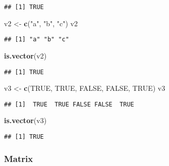 \documentclass[
]{article}
\newenvironment{Shaded}{\begin{snugshade}}{\end{snugshade}}
\newcommand{\ConstantTok}[1]{\textcolor[rgb]{0.56,0.35,0.01}{#1}}
\newcommand{\FunctionTok}[1]{\textcolor[rgb]{0.13,0.29,0.53}{\textbf{#1}}}
\newcommand{\NormalTok}[1]{#1}
\newcommand{\OtherTok}[1]{\textcolor[rgb]{0.56,0.35,0.01}{#1}}
\newcommand{\StringTok}[1]{\textcolor[rgb]{0.31,0.60,0.02}{#1}}
\begin{document}
\begin{verbatim}
## [1] TRUE
\end{verbatim}

\begin{Shaded}
\begin{Highlighting}[]
\NormalTok{v2 }\OtherTok{\textless{}{-}} \FunctionTok{c}\NormalTok{(}\StringTok{"a"}\NormalTok{, }\StringTok{"b"}\NormalTok{, }\StringTok{"c"}\NormalTok{)}
\NormalTok{v2}
\end{Highlighting}
\end{Shaded}

\begin{verbatim}
## [1] "a" "b" "c"
\end{verbatim}

\begin{Shaded}
\begin{Highlighting}[]
\FunctionTok{is.vector}\NormalTok{(v2)}
\end{Highlighting}
\end{Shaded}

\begin{verbatim}
## [1] TRUE
\end{verbatim}

\begin{Shaded}
\begin{Highlighting}[]
\NormalTok{v3 }\OtherTok{\textless{}{-}} \FunctionTok{c}\NormalTok{(}\ConstantTok{TRUE}\NormalTok{, }\ConstantTok{TRUE}\NormalTok{, }\ConstantTok{FALSE}\NormalTok{, }\ConstantTok{FALSE}\NormalTok{, }\ConstantTok{TRUE}\NormalTok{)}
\NormalTok{v3}
\end{Highlighting}
\end{Shaded}

\begin{verbatim}
## [1]  TRUE  TRUE FALSE FALSE  TRUE
\end{verbatim}

\begin{Shaded}
\begin{Highlighting}[]
\FunctionTok{is.vector}\NormalTok{(v3)}
\end{Highlighting}
\end{Shaded}

\begin{verbatim}
## [1] TRUE
\end{verbatim}

\subsubsection{Matrix}\label{matrix}
\end{document}
